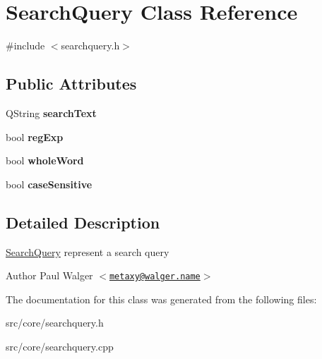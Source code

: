 \hypertarget{classSearchQuery}{
\section{SearchQuery Class Reference}
\label{classSearchQuery}
}


{\ttfamily \#include $<$searchquery.h$>$}\subsection*{Public Attributes}
\begin{DoxyCompactItemize}
\item 
\hypertarget{classSearchQuery_ac1a81a6b032b5f72718324343174ae04}{
QString {\bfseries searchText}}
\label{classSearchQuery_ac1a81a6b032b5f72718324343174ae04}

\item 
\hypertarget{classSearchQuery_a635a08b8d0451a89a4340b14b0d3e832}{
bool {\bfseries regExp}}
\label{classSearchQuery_a635a08b8d0451a89a4340b14b0d3e832}

\item 
\hypertarget{classSearchQuery_a0fa67e4d661aab663f5123ea61a045c7}{
bool {\bfseries wholeWord}}
\label{classSearchQuery_a0fa67e4d661aab663f5123ea61a045c7}

\item 
\hypertarget{classSearchQuery_a2b744cf7f53cf61650156d4df675ccbe}{
bool {\bfseries caseSensitive}}
\label{classSearchQuery_a2b744cf7f53cf61650156d4df675ccbe}

\end{DoxyCompactItemize}


\subsection{Detailed Description}
\hyperlink{classSearchQuery}{SearchQuery} represent a search query

\begin{DoxyAuthor}{Author}
Paul Walger $<$\href{mailto:metaxy@walger.name}{\tt metaxy@walger.name}$>$ 
\end{DoxyAuthor}


The documentation for this class was generated from the following files:\begin{DoxyCompactItemize}
\item 
src/core/searchquery.h\item 
src/core/searchquery.cpp\end{DoxyCompactItemize}

